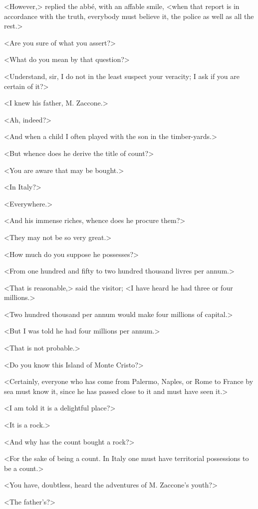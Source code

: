  <However,> replied the abbé, with an affable smile, <when that report is in accordance with the truth, everybody must believe it, the police as well as all the rest.> 

 <Are you sure of what you assert?> 

 <What do you mean by that question?> 

 <Understand, sir, I do not in the least suspect your veracity; I ask if you are certain of it?> 

 <I knew his father, M. Zaccone.> 

 <Ah, indeed?> 

 <And when a child I often played with the son in the timber-yards.> 

 <But whence does he derive the title of count?> 

 <You are aware that may be bought.> 

 <In Italy?> 

 <Everywhere.> 

 <And his immense riches, whence does he procure them?> 

 <They may not be so very great.> 

 <How much do you suppose he possesses?> 

 <From one hundred and fifty to two hundred thousand livres per annum.> 

 <That is reasonable,> said the visitor; <I have heard he had three or four millions.> 

 <Two hundred thousand per annum would make four millions of capital.> 

 <But I was told he had four millions per annum.> 

 <That is not probable.> 

 <Do you know this Island of Monte Cristo?> 

 <Certainly, everyone who has come from Palermo, Naples, or Rome to France by sea must know it, since he has passed close to it and must have seen it.> 

 <I am told it is a delightful place?> 

 <It is a rock.> 

 <And why has the count bought a rock?> 

 <For the sake of being a count. In Italy one must have territorial possessions to be a count.> 

 <You have, doubtless, heard the adventures of M. Zaccone's youth?> 

 <The father's?> 

